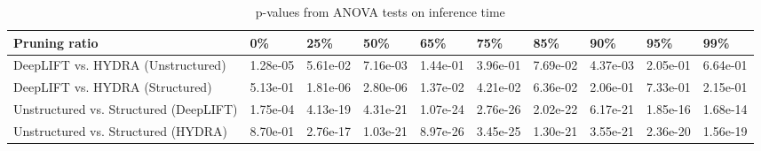 \documentclass[journal,onecolumn,12pt]{IEEEtran}
\begin{document}
\begin{table}[htbp]
    \caption{p-values from ANOVA tests on inference time}
    \begin{center}
    \begin{tabular}{ |p{3cm}|p{1.2cm}|p{1.2cm}|p{1.2cm}|p{1.2cm}|p{1.2cm}|p{1.2cm}|p{1.2cm}|p{1.2cm}|p{1.2cm}|  }
     \hline
     Pruning ratio  & 0\% & 25\%& 50\%& 65\%& 75\%& 85\%& 90\%& 95\%& 99\%\\
     \hline
     DeepLIFT vs. HYDRA (Unstructured)    & 1.28e-05& 5.61e-02& 7.16e-03& 1.44e-01& 3.96e-01& 7.69e-02& 4.37e-03& 2.05e-01& 6.64e-01 \\
     DeepLIFT vs. HYDRA (Structured)     & 5.13e-01& 1.81e-06& 2.80e-06& 1.37e-02& 4.21e-02& 6.36e-02& 2.06e-01& 7.33e-01& 2.15e-01\\
     \hline
     Unstructured vs. Structured (DeepLIFT)      & 1.75e-04& 4.13e-19& 4.31e-21& 1.07e-24& 2.76e-26& 2.02e-22& 6.17e-21& 1.85e-16& 1.68e-14 \\
     Unstructured vs. Structured (HYDRA)    & 8.70e-01& 2.76e-17& 1.03e-21& 8.97e-26& 3.45e-25& 1.30e-21& 3.55e-21& 2.36e-20& 1.56e-19\\
     \hline
    \end{tabular}
    \end{center}
    \label{tab:p-time}
\end{table}
\end{document}
